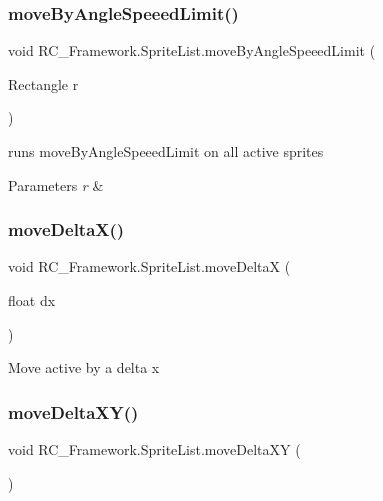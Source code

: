 \subsubsection{\texorpdfstring{move\+By\+Angle\+Speeed\+Limit()}{moveByAngleSpeeedLimit()}}
{\footnotesize\ttfamily void R\+C\+\_\+\+Framework.\+Sprite\+List.\+move\+By\+Angle\+Speeed\+Limit (\begin{DoxyParamCaption}\item[{Rectangle}]{r }\end{DoxyParamCaption})}



runs move\+By\+Angle\+Speeed\+Limit on all active sprites 


\begin{DoxyParams}{Parameters}
{\em r} & \\
\hline
\end{DoxyParams}
\mbox{\label{class_r_c___framework_1_1_sprite_list_ab65f3d6bc7574e4b5df5c36b09d4d0b7}} 
\subsubsection{\texorpdfstring{move\+Delta\+X()}{moveDeltaX()}}
{\footnotesize\ttfamily void R\+C\+\_\+\+Framework.\+Sprite\+List.\+move\+DeltaX (\begin{DoxyParamCaption}\item[{float}]{dx }\end{DoxyParamCaption})}



Move active by a delta x 

\mbox{\label{class_r_c___framework_1_1_sprite_list_a7412f51e494ab844da5c81c24d1b24a9}} 
\subsubsection{\texorpdfstring{move\+Delta\+X\+Y()}{moveDeltaXY()}}
{\footnotesize\ttfamily void R\+C\+\_\+\+Framework.\+Sprite\+List.\+move\+Delta\+XY (\begin{DoxyParamCaption}{ }\end{DoxyParamCaption})}



